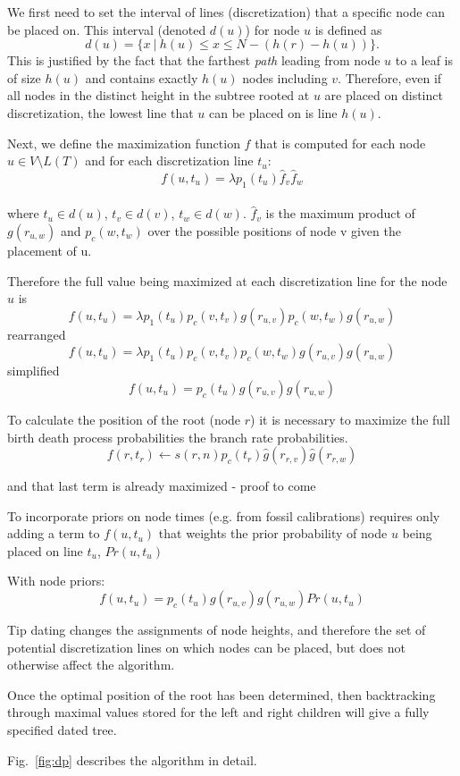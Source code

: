 \documentclass{llncs}
\newcommand{\ejmcomment}[1]{{\color{green} #1}}
\begin{document}
We first need to set the interval of lines (discretization) that a specific
node can be placed on.  This interval (denoted $d(u)$) for node $u$ is defined
as $$ d(u) = \{ x\ |\  h(u) \leq x \leq N - (h(r) - h(u))\}.$$  This is
justified by the fact that the farthest {\em path} leading from node $u$ to a
leaf is of size $h(u)$ and contains exactly $h(u)$ nodes including $v$.
Therefore, even if all nodes in the distinct height in the subtree rooted at
$u$ are placed on distinct discretization, the lowest line that $u$ can be
placed on is line $h(u)$.

Next, we define the maximization function $f$ that is computed for each node $u \in
V\setminus L(T)$ and for each discretization line $t_u$:  
$$f(u,t_u) = \lambda p_1(t_u) \hat{f}_v \hat{f}_w $$\\ 
where $t_u \in d(u)$, $t_v \in d(v)$, $t_w \in
d(w)$.
$\hat{f}_v$ is the maximum product of $g(r_{u,w})$ and $p_c(w,t_w)$
over the possible positions of node v given the placement of u.

Therefore the full value being maximized at each discretization line for the node $u$
is 
$$f(u,t_u) = \lambda p_1(t_u) p_c(v,t_v) g(r_{u,v}) p_c(w,t_w) g(r_{u,w})$$
rearranged
$$f(u,t_u) = \lambda p_1(t_u) p_c(v,t_v)  p_c(w,t_w) g(r_{u,v}) g(r_{u,w})$$
simplified
$$f(u,t_u) = p_c(t_u) g(r_{u,v}) g(r_{u,w})$$

To calculate the position of the root (node $r$) it is necessary to maximize the
full birth death process probabilities the branch rate probabilities.
$$f(r,t_r) \leftarrow s(r,n) p_c(t_{r}) \hat g(r_{r,v}) \hat g(r_{r,w})$$

\ejmcomment{and that last term is already maximized - proof to come}

To incorporate priors on node times (e.g. from fossil calibrations)
requires only adding a term to $f(u,t_u)$ that weights the prior probability of 
node $u$ being placed on line $t_u$, $Pr(u,t_u)$

With node priors:
$$f(u,t_u) = p_c(t_u) g(r_{u,v}) g(r_{u,w}) Pr(u,t_u)$$

Tip dating changes the assignments of node heights, and therefore 
the set of potential discretization lines on which nodes can be placed,
but does not otherwise affect the algorithm.

Once the optimal position of the root has been determined,
then backtracking through maximal values stored for the 
left and right children will give a fully specified dated tree.


Fig.~\ref{fig:dp} describes the algorithm in detail.
\end{document}
